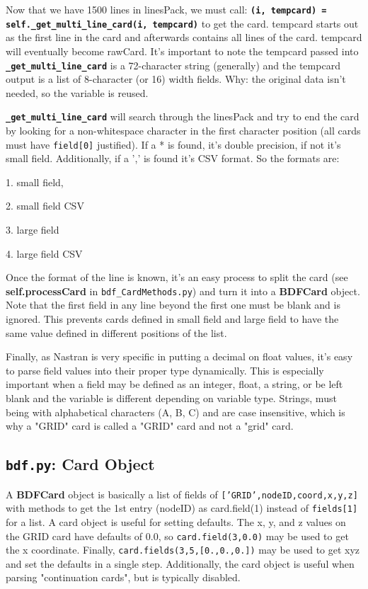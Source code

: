      Now that we have 1500 lines in linesPack, we must call:  {\bf \tt (i, tempcard) = self.\_get\_multi\_line\_card(i, tempcard)} to get the card.  tempcard starts out as the first line in the card and afterwards contains all lines of the card. tempcard will eventually become rawCard.  It's important to note the tempcard passed into {\bf \tt \_get\_multi\_line\_card} is a 72-character string (generally) and the tempcard output is a list of 8-character (or 16) width fields.  Why: the original data isn't needed, so the variable is reused.
     
     {\bf \tt \_get\_multi\_line\_card} will search through the linesPack and try to end the card by looking for a non-whitespace character in the first character position (all cards must have {\tt field[0]} justified).  If a * is found, it's double precision, if not it's small field.  Additionally, if a ',' is found it's CSV format.  So the formats are:

       1. small field,

       2. small field CSV

       3. large field

       4. large field CSV
     
     Once the format of the line is known, it's an easy process to split the card (see {\bf self.processCard} in {\tt bdf\_CardMethods.py}) and turn it into a {\bf BDFCard} object.  Note that the first field in any line beyond the first one must be blank and is ignored.  This prevents cards defined in small field and large field to have the same value defined in different positions of the list.
     
     Finally, as Nastran is very specific in putting a decimal on float values, it's easy to parse field values into their proper type dynamically.  This is especially important when a field may be defined as an integer, float, a string, or be left blank and the variable is different depending on variable type.  Strings, must being with alphabetical characters (A, B, C) and are case insensitive, which is why a "GRID" card is called a "GRID" card and not a "grid" card.
     
     
 \subsection{{\tt bdf.py}: Card Object}
     A {\bf BDFCard} object is basically a list of fields of {\tt ['GRID',nodeID,coord,x,y,z]}  with methods to get the 1st entry (nodeID) as card.field(1) instead of {\tt fields[1]} for a list.  A card object is useful for setting defaults.  The x, y, and z values on the GRID card have defaults of 0.0, so {\tt card.field(3,0.0)} may be used to get the x coordinate. Finally, {\tt card.fields(3,5,[0.,0.,0.])} may be used to get xyz and set the defaults in a single step.  Additionally, the card object is useful when parsing "continuation cards", but is typically disabled.  
     
